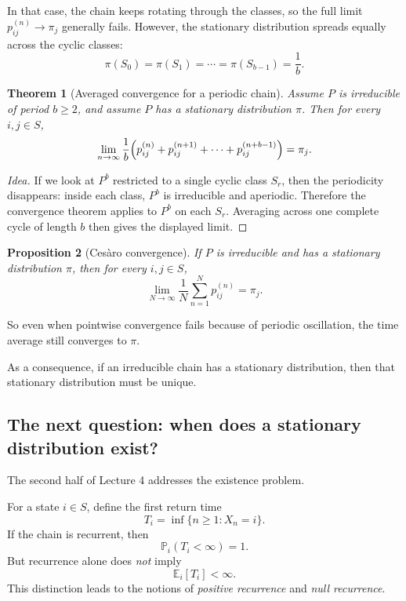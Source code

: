 \documentclass[11pt]{article}
\newtheorem{theorem}{Theorem}[section]
\newtheorem{proposition}[theorem]{Proposition}
\theoremstyle{definition}
\begin{document}
In that case, the chain keeps rotating through the classes, so the full limit \(p_{ij}^{(n)}\to \pi_j\) generally fails. However, the stationary distribution spreads equally across the cyclic classes:
\[
\pi(S_0)=\pi(S_1)=\cdots=\pi(S_{b-1})=\frac{1}{b}.
\]

\begin{theorem}[Averaged convergence for a periodic chain]
Assume \(P\) is irreducible of period \(b\ge 2\), and assume \(P\) has a stationary distribution \(\pi\). Then for every \(i,j\in S\),
\[
\lim_{n\to\infty}
\frac1b\Bigl(
p_{ij}^{(n)}+p_{ij}^{(n+1)}+\cdots+p_{ij}^{(n+b-1)}
\Bigr)
=
\pi_j.
\]
\end{theorem}

\begin{proof}[Idea]
If we look at \(P^b\) restricted to a single cyclic class \(S_r\), then the periodicity disappears: inside each class, \(P^b\) is irreducible and aperiodic. Therefore the convergence theorem applies to \(P^b\) on each \(S_r\). Averaging across one complete cycle of length \(b\) then gives the displayed limit.
\end{proof}

\begin{proposition}[Ces\`aro convergence]
If \(P\) is irreducible and has a stationary distribution \(\pi\), then for every \(i,j\in S\),
\[
\lim_{N\to\infty}\frac1N\sum_{n=1}^{N} p_{ij}^{(n)}=\pi_j.
\]
\end{proposition}

So even when pointwise convergence fails because of periodic oscillation, the time average still converges to \(\pi\).

As a consequence, if an irreducible chain has a stationary distribution, then that stationary distribution must be unique.

\subsection{The next question: when does a stationary distribution exist?}

The second half of Lecture 4 addresses the existence problem.

For a state \(i\in S\), define the first return time
\[
T_i = \inf\{n\ge 1 : X_n=i\}.
\]
If the chain is recurrent, then
\[
\mathbb P_i(T_i<\infty)=1.
\]
But recurrence alone does \emph{not} imply
\[
\mathbb E_i[T_i]<\infty.
\]
This distinction leads to the notions of \emph{positive recurrence} and \emph{null recurrence}.
\end{document}
